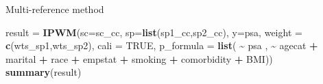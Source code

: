 \documentclass[
  ignorenonframetext,
]{beamer}
\newenvironment{Shaded}{\begin{snugshade}}{\end{snugshade}}
\newcommand{\AttributeTok}[1]{\textcolor[rgb]{0.13,0.29,0.53}{#1}}
\newcommand{\ConstantTok}[1]{\textcolor[rgb]{0.56,0.35,0.01}{#1}}
\newcommand{\FunctionTok}[1]{\textcolor[rgb]{0.13,0.29,0.53}{\textbf{#1}}}
\newcommand{\NormalTok}[1]{#1}
\newcommand{\OtherTok}[1]{\textcolor[rgb]{0.56,0.35,0.01}{#1}}
\newcommand{\SpecialCharTok}[1]{\textcolor[rgb]{0.81,0.36,0.00}{\textbf{#1}}}
\newcommand{\StringTok}[1]{\textcolor[rgb]{0.31,0.60,0.02}{#1}}
\begin{document}
\begin{frame}[fragile]{Multi-reference method}
\label{multi-reference-method}
\begin{Shaded}
\begin{Highlighting}[]
\NormalTok{result }\OtherTok{=} \FunctionTok{IPWM}\NormalTok{(}\AttributeTok{sc=}\NormalTok{sc\_cc, }\AttributeTok{sp=}\FunctionTok{list}\NormalTok{(sp1\_cc,sp2\_cc), }\AttributeTok{y=}\StringTok{\textquotesingle{}psa\textquotesingle{}}\NormalTok{, }
              \AttributeTok{weight =} \FunctionTok{c}\NormalTok{(}\StringTok{\textquotesingle{}wts\_sp1\textquotesingle{}}\NormalTok{,}\StringTok{\textquotesingle{}wts\_sp2\textquotesingle{}}\NormalTok{),  }\AttributeTok{cali =} \ConstantTok{TRUE}\NormalTok{,}
              \AttributeTok{p\_formula =} \FunctionTok{list}\NormalTok{( }\SpecialCharTok{\textasciitilde{}}\NormalTok{ psa ,}
                                \SpecialCharTok{\textasciitilde{}}\NormalTok{ agecat }\SpecialCharTok{+}\NormalTok{ marital }\SpecialCharTok{+}\NormalTok{ race }\SpecialCharTok{+}\NormalTok{ empstat }\SpecialCharTok{+}\NormalTok{ smoking }\SpecialCharTok{+}\NormalTok{ comorbidity }\SpecialCharTok{+}\NormalTok{  BMI))}
\FunctionTok{summary}\NormalTok{(result)}
\end{Highlighting}
\end{Shaded}


\end{frame}
\end{document}
